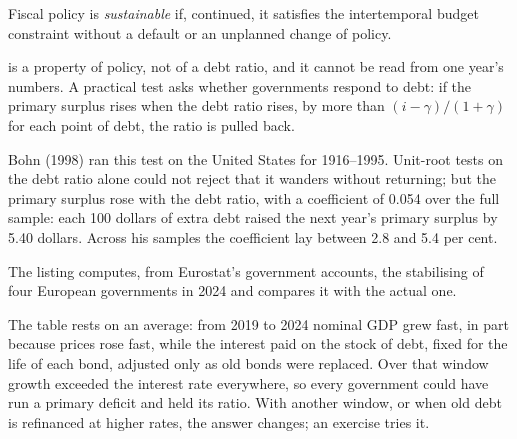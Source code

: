 \begin{definition}\label{def:b2:government-debt:sustainability}
Fiscal policy is \emph{sustainable} if, continued, it satisfies the intertemporal budget
constraint without a default or an unplanned change of policy.
\end{definition}

 is a property of policy, not of a debt ratio, and it cannot be read from one year's numbers. A practical
test asks whether governments respond to debt: if the primary surplus rises when the debt ratio rises, by more than $(i - \gamma)/(1 + \gamma)$
for each point of debt, the ratio is pulled back.

Bohn (1998) ran this test on the United States for 1916--1995. Unit-root tests on the debt ratio alone could not reject that
it wanders without returning; but the primary surplus rose with the debt ratio, with a coefficient of 0.054 over the full
sample: each 100 dollars of extra debt raised the next year's primary surplus by 5.40 dollars. Across his samples the
coefficient lay between 2.8 and 5.4 per cent.

The listing computes, from Eurostat's government accounts, the stabilising  of four European governments
in 2024 and compares it with the actual one.

\label{lst:b2:government-debt:stabilise}

\label{out:b2:government-debt:stabilise}

The table rests on an average: from 2019 to 2024 nominal GDP grew fast, in part because prices rose fast, while the
interest paid on the stock of debt, fixed for the life of each bond, adjusted only as old bonds were replaced. Over that window growth
exceeded the interest rate everywhere, so every government could have run a primary deficit and held its ratio. With
another window, or when old debt is refinanced at higher rates, the answer changes; an exercise tries it.

